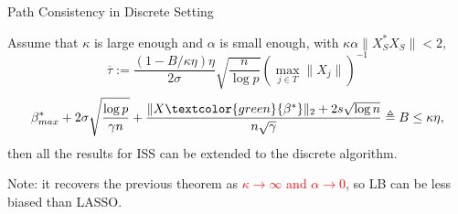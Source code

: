 \documentclass[slidestop,compress,9pt,epsfig,color]{beamer}
\theoremstyle{example}
\begin{document}



\begin{frame}{Path Consistency in Discrete Setting}
\begin{theorem}[\textcolor{blue}{Osher-Ruan-Xiong-Y.-Yin'2016}] %
Assume that $\kappa$ is large enough and $\alpha$ is small enough, with $\kappa \alpha \|X^*_S X_S\|<2$,
$$\overline{\tau} := \frac{(1 - B/\kappa\eta)\eta} {2 \sigma} \sqrt{\frac{n}{\log p}} \left (\max_{j\in T} \|X_j\|\right )^{-1} $$
$$ \beta^*_{max} + 2 \sigma \sqrt{\frac{\log p}{\gamma n}}  + \frac{\|X\textcolor{green}{\beta^*}\|_2 + 2s\sqrt{\log{n}}}{n\sqrt{\gamma}} \triangleq B \leq \kappa\eta, $$
then all the results for ISS can be extended to the discrete algorithm.
\end{theorem}
Note: it recovers the previous theorem as \textcolor{red}{$\kappa\to \infty$ and $\alpha\to 0$}, so LB can be less biased than LASSO.
\end{frame}
\end{document}
